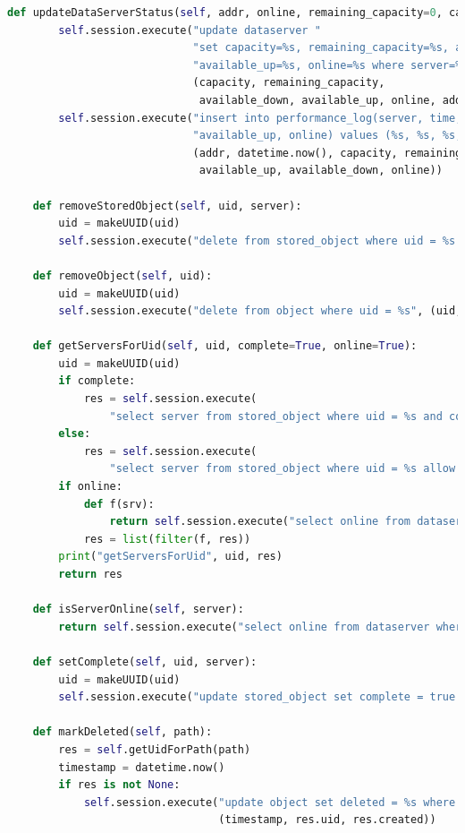 \documentclass{article}
\begin{document}
\begin{lstlisting}[language=Python, title=Codice]
    def updateDataServerStatus(self, addr, online, remaining_capacity=0, capacity=0, available_down=.0, available_up=.0):
        self.session.execute("update dataserver "
                             "set capacity=%s, remaining_capacity=%s, available_down=%s, "
                             "available_up=%s, online=%s where server=%s",
                             (capacity, remaining_capacity,
                              available_down, available_up, online, addr))
        self.session.execute("insert into performance_log(server, time, capacity, remaining_capacity, available_down,"
                             "available_up, online) values (%s, %s, %s, %s, %s, %s, %s)",
                             (addr, datetime.now(), capacity, remaining_capacity,
                              available_up, available_down, online))

    def removeStoredObject(self, uid, server):
        uid = makeUUID(uid)
        self.session.execute("delete from stored_object where uid = %s and server = %s", (uid, server))

    def removeObject(self, uid):
        uid = makeUUID(uid)
        self.session.execute("delete from object where uid = %s", (uid, ))

    def getServersForUid(self, uid, complete=True, online=True):
        uid = makeUUID(uid)
        if complete:
            res = self.session.execute(
                "select server from stored_object where uid = %s and complete = true allow filtering", (uid, )).all()
        else:
            res = self.session.execute(
                "select server from stored_object where uid = %s allow filtering", (uid, )).all()
        if online:
            def f(srv):
                return self.session.execute("select online from dataserver where server = %s", (srv.server, )).one().online
            res = list(filter(f, res))
        print("getServersForUid", uid, res)
        return res

    def isServerOnline(self, server):
        return self.session.execute("select online from dataserver where server = %s", (server, )).one().online

    def setComplete(self, uid, server):
        uid = makeUUID(uid)
        self.session.execute("update stored_object set complete = true where uid = %s and server = %s", (uid, server))

    def markDeleted(self, path):
        res = self.getUidForPath(path)
        timestamp = datetime.now()
        if res is not None:
            self.session.execute("update object set deleted = %s where uid = %s and created = %s",
                                 (timestamp, res.uid, res.created))


\end{lstlisting}
\end{document}
